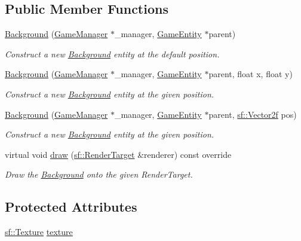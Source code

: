 \subsection*{Public Member Functions}
\begin{DoxyCompactItemize}
\item 
\mbox{\hyperlink{class_background_a675fdd2d1e1ebbe036e4d7d96ec4ff53}{Background}} (\mbox{\hyperlink{class_game_manager}{Game\+Manager}} $\ast$\+\_\+manager, \mbox{\hyperlink{class_game_entity}{Game\+Entity}} $\ast$parent)
\begin{DoxyCompactList}\small\item\em Construct a new \mbox{\hyperlink{class_background}{Background}} entity at the default position. \end{DoxyCompactList}\item 
\mbox{\hyperlink{class_background_ae64742f05c5b2f6a5f69c0f1bba613ab}{Background}} (\mbox{\hyperlink{class_game_manager}{Game\+Manager}} $\ast$\+\_\+manager, \mbox{\hyperlink{class_game_entity}{Game\+Entity}} $\ast$parent, float x, float y)
\begin{DoxyCompactList}\small\item\em Construct a new \mbox{\hyperlink{class_background}{Background}} entity at the given position. \end{DoxyCompactList}\item 
\mbox{\hyperlink{class_background_a66b52030bdb10d332f7757fc575b730c}{Background}} (\mbox{\hyperlink{class_game_manager}{Game\+Manager}} $\ast$\+\_\+manager, \mbox{\hyperlink{class_game_entity}{Game\+Entity}} $\ast$parent, \mbox{\hyperlink{classsf_1_1_vector2}{sf\+::\+Vector2f}} pos)
\begin{DoxyCompactList}\small\item\em Construct a new \mbox{\hyperlink{class_background}{Background}} entity at the given position. \end{DoxyCompactList}\item 
virtual void \mbox{\hyperlink{class_background_a888accdc54e970a758fdd6b8e96f97fa}{draw}} (\mbox{\hyperlink{classsf_1_1_render_target}{sf\+::\+Render\+Target}} \&renderer) const override
\begin{DoxyCompactList}\small\item\em Draw the \mbox{\hyperlink{class_background}{Background}} onto the given Render\+Target. \end{DoxyCompactList}\end{DoxyCompactItemize}
\subsection*{Protected Attributes}
\begin{DoxyCompactItemize}
\item 
\mbox{\hyperlink{classsf_1_1_texture}{sf\+::\+Texture}} \mbox{\hyperlink{class_background_a6927e190fe6e348232db3c82b5bd0785}{texture}}
\end{DoxyCompactItemize}
